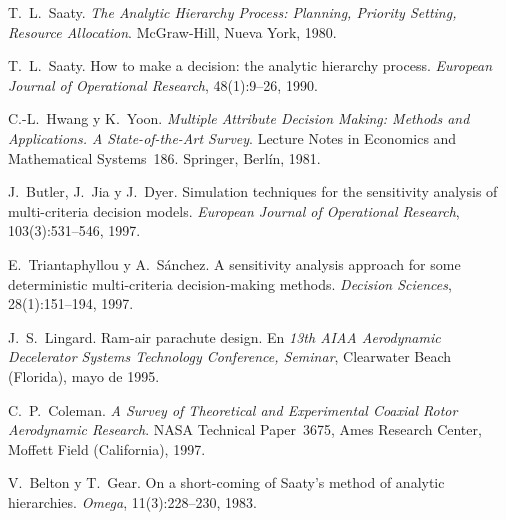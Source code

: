  T.~L.~Saaty. \emph{The Analytic Hierarchy Process: Planning,
  Priority Setting, Resource Allocation}. McGraw-Hill, Nueva York, 1980.

 T.~L.~Saaty. How to make a decision: the analytic hierarchy
  process. \emph{European Journal of Operational Research}, 48(1):9--26, 1990.

 C.-L.~Hwang y K.~Yoon. \emph{Multiple Attribute Decision
  Making: Methods and Applications. A State-of-the-Art Survey}. Lecture Notes in Economics
  and Mathematical Systems~186. Springer, Berlín, 1981.

 J.~Butler, J.~Jia y J.~Dyer. Simulation techniques for the
  sensitivity analysis of multi-criteria decision models. \emph{European Journal of
  Operational Research}, 103(3):531--546, 1997.

 E.~Triantaphyllou y A.~Sánchez. A sensitivity
  analysis approach for some deterministic multi-criteria decision-making methods.
  \emph{Decision Sciences}, 28(1):151--194, 1997.

 J.~S.~Lingard. Ram-air parachute design. En \emph{13th
  AIAA Aerodynamic Decelerator Systems Technology Conference, Seminar}, Clearwater Beach
  (Florida), mayo de 1995.

 C.~P.~Coleman. \emph{A Survey of Theoretical and
  Experimental Coaxial Rotor Aerodynamic Research}. NASA Technical Paper~3675, Ames
  Research Center, Moffett Field (California), 1997.

 V.~Belton y T.~Gear. On a short-coming of Saaty's method
  of analytic hierarchies. \emph{Omega}, 11(3):228--230, 1983.
